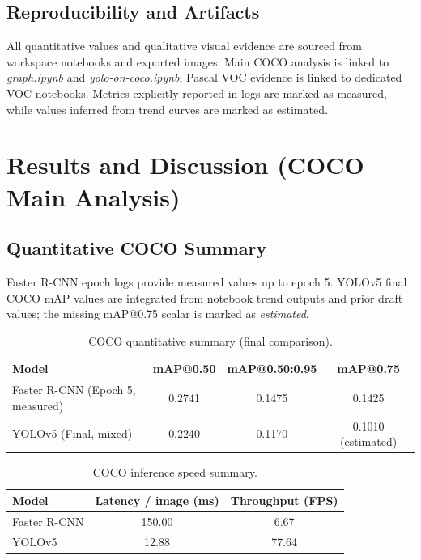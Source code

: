 \documentclass[conference]{IEEEtran}
\begin{document}
\subsection{Reproducibility and Artifacts}
All quantitative values and qualitative visual evidence are sourced from workspace notebooks and exported images. Main COCO analysis is linked to \textit{graph.ipynb} and \textit{yolo-on-coco.ipynb}; Pascal VOC evidence is linked to dedicated VOC notebooks. Metrics explicitly reported in logs are marked as measured, while values inferred from trend curves are marked as estimated.

\section{Results and Discussion (COCO Main Analysis)}
\subsection{Quantitative COCO Summary}
Faster R-CNN epoch logs provide measured values up to epoch 5. YOLOv5 final COCO mAP values are integrated from notebook trend outputs and prior draft values; the missing mAP@0.75 scalar is marked as \textit{estimated}.

\begin{table}[!t]
\centering
\caption{COCO quantitative summary (final comparison).}
\label{tab:coco-main}
\begin{tabular}{lccc}
\toprule
\textbf{Model} & \textbf{mAP@0.50} & \textbf{mAP@0.50:0.95} & \textbf{mAP@0.75} \\
\midrule
Faster R-CNN (Epoch 5, measured) & 0.2741 & 0.1475 & 0.1425 \\
YOLOv5 (Final, mixed) & 0.2240 & 0.1170 & 0.1010 (estimated) \\
\bottomrule
\end{tabular}
\end{table}

\begin{table}[!t]
\centering
\caption{COCO inference speed summary.}
\label{tab:coco-speed}
\begin{tabular}{lcc}
\toprule
\textbf{Model} & \textbf{Latency / image (ms)} & \textbf{Throughput (FPS)} \\
\midrule
Faster R-CNN & 150.00 & 6.67 \\
YOLOv5 & 12.88 & 77.64 \\
\bottomrule
\end{tabular}
\end{table}
\end{document}
